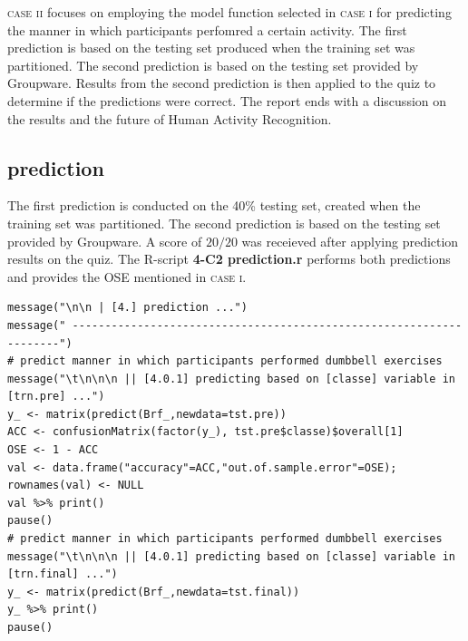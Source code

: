 \documentclass[10pt, twoside]{article}
\begin{document}
\noindent
\textsc{case ii} focuses on employing the model function selected in \textsc{case i} for predicting the manner
in which participants perfomred a certain activity. The first prediction is based on the
testing set produced when the training set was partitioned. The second prediction is based on
the testing set provided by Groupware. Results from the second prediction is then applied to
the quiz to determine if the predictions were correct. The report ends with a 
discussion on the results and the future of Human Activity Recognition.
\bigskip

\begin{center}
\subsection{prediction}
\vspace{-3ex}
\end{center}

\noindent
The first prediction is conducted on the 40\% testing set, created when the training set
was partitioned. The second prediction is based on the testing set provided by Groupware.
A score of $20/20$ was receieved after applying prediction results on the quiz. The R-script
\textbf{4-C2 prediction.r} performs both predictions and provides the OSE mentioned in \textsc{case i}.
\bigskip

\begin{verbatim}
message("\n\n | [4.] prediction ...")
message(" --------------------------------------------------------------------")
# predict manner in which participants performed dumbbell exercises
message("\t\n\n\n || [4.0.1] predicting based on [classe] variable in [trn.pre] ...")
y_ <- matrix(predict(Brf_,newdata=tst.pre))
ACC <- confusionMatrix(factor(y_), tst.pre$classe)$overall[1]
OSE <- 1 - ACC
val <- data.frame("accuracy"=ACC,"out.of.sample.error"=OSE); rownames(val) <- NULL
val %>% print()
pause()
# predict manner in which participants performed dumbbell exercises
message("\t\n\n\n || [4.0.1] predicting based on [classe] variable in [trn.final] ...")
y_ <- matrix(predict(Brf_,newdata=tst.final))
y_ %>% print()
pause()
\end{verbatim}
\end{document}
